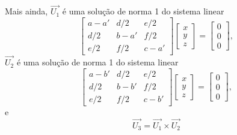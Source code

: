 \begin{teorema}
  Mais ainda, $\vec{U_1}$ \'e uma solu\c{c}\~ao de norma 1 do sistema linear
  \[
    \begin{bmatrix}
      a - a' & d/2 & e/2\\
      d/2 & b - a' & f/2\\
      e/2 & f/2 & c - a'
    \end{bmatrix} \begin{bmatrix}
      x\\y\\z
    \end{bmatrix} = \begin{bmatrix}
      0\\0\\0
    \end{bmatrix},
  \]
  $\vec{U_2}$ \'e uma solu\c{c}\~ao de norma 1 do sistema linear
  \[
    \begin{bmatrix}
      a - b' & d/2 & e/2\\
      d/2 & b - b' & f/2\\
      e/2 & f/2 & c - b'
    \end{bmatrix} \begin{bmatrix}
      x\\y\\z
    \end{bmatrix} = \begin{bmatrix}
      0\\0\\0
    \end{bmatrix},
  \]
  e
  \[
  	\vec{U_3} = \vec{U_1} \times \vec{U_2}
  \]
\end{teorema}

